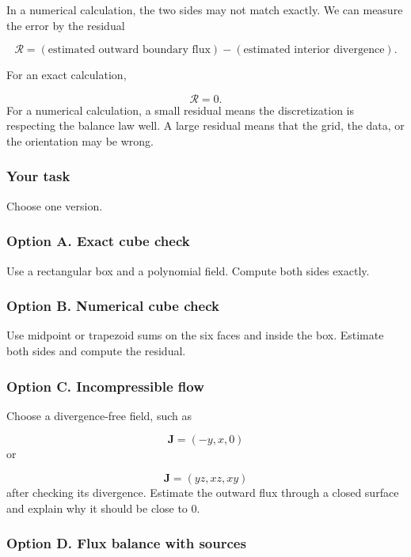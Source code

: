 In a numerical calculation, the two sides may not match exactly.  We can measure the
error by the residual

\[
\boxed{
    \mathcal R
    =
    \left(
    \text{estimated outward boundary flux}
    \right)
    -
    \left(
    \text{estimated interior divergence}
    \right).
}
\]

For an exact calculation,

\[
    \mathcal R=0.
\]
For a numerical calculation, a small residual means the discretization is respecting the
balance law well.  A large residual means that the grid, the data, or the orientation may
be wrong.



\subsubsection*{Your task}

Choose one version.

\subsubsection*{Option A. Exact cube check}

Use a rectangular box and a polynomial field.  Compute both sides exactly.

\subsubsection*{Option B. Numerical cube check}

Use midpoint or trapezoid sums on the six faces and inside the box.  Estimate both
sides and compute the residual.

\subsubsection*{Option C. Incompressible flow}

Choose a divergence-free field, such as

\[
    \mathbf J=(-y,x,0)
\]
or

\[
    \mathbf J=(yz,xz,xy)
\]
after checking its divergence.  Estimate the outward flux through a closed surface and
explain why it should be close to \(0\).

\subsubsection*{Option D. Flux balance with sources}

